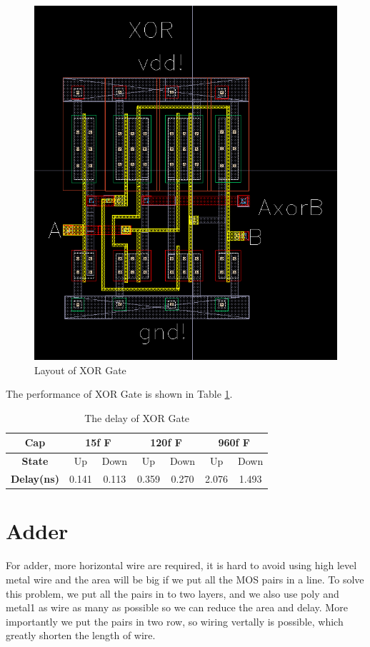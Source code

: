 \documentclass[conference]{IEEEtran}
\begin{document}
\begin{figure}[H]
    \centering
    \includegraphics[width = 0.6\linewidth]{xor2_layout.png}
    \caption{Layout of XOR Gate}
    \label{Layout of XOR Gate}
\end{figure}

The performance of XOR Gate is shown in Table \ref{The delay of XOR}.

\begin{table}[h]
    \caption{The delay of XOR Gate}
    \begin{center}
        \begin{tabular}{|c|c|c|c|c|c|c|}
            \hline
            \textbf{Cap} & \multicolumn{2}{|c|}{15f F} & \multicolumn{2}{|c|}{120f F} & \multicolumn{2}{|c|}{960f F} \\
            \hline
            \textbf{State} & Up & Down & Up & Down & Up & Down \\
            \hline
            \textbf{Delay(ns)} & 0.141 & 0.113 & 0.359 & 0.270 & 2.076 & 1.493 \\
            \hline
        \end{tabular}
    \end{center}
    \label{The delay of XOR}
\end{table}

\section{Adder}

For adder, more horizontal wire are required, it is hard to avoid using high level metal wire and the area will be big if we put all the MOS pairs in a line. To solve this problem, we put all the pairs in to two layers, and we also use poly and metal1 as wire as many as possible so we can reduce the area and delay. More importantly we put the pairs in two row, so wiring vertally is possible, which greatly shorten the length of wire. 
\end{document}
